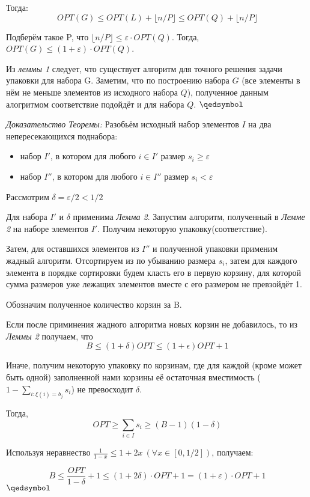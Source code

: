 \documentclass[a4paper,14pt,russian]{article}
\begin{document}
Тогда:
$$ OPT(G) \leq OPT(L) + \lfloor{n/P\rfloor} \leq OPT(Q) + \lfloor{n/P\rfloor}$$

Подберём такое P, что $\lfloor{n/P\rfloor} \leq \varepsilon \cdot OPT(Q)$.
Тогда, $OPT(G) \leq (1 + \varepsilon) \cdot OPT(Q)$. 

Из \textit{леммы 1} следует, что существует алгоритм для точного решения задачи упаковки для набора G. Заметим, что по построению набора $G$ (все элементы в нём не меньше элементов из исходного набора $Q$), полученное данным алогритмом соответствие подойдёт и для набора $Q$.
$\qedsymbol$

\textit{Доказательство Теоремы:} Разобьём исходный набор элементов $I$ на два непересекающихся поднабора:

\begin{itemize}
  \item набор $I'$, в котором для любого $i \in I'$ размер $s_{i} \geq \varepsilon$ 
  \item набор $I''$, в котором для любого $i \in I''$ размер $s_{i} < \varepsilon$ 
\end{itemize}

Рассмотрим $\delta = \varepsilon / 2 < 1/2$

Для набора $I'$ и $\delta$ применима \textit{Лемма 2}. Запустим алгоритм, полученный в \textit{Лемме 2} на наборе элементов $I'$. Получим некоторую упаковку(соответствие). 

Затем, для оставшихся элементов из $I''$ и полученной упаковки применим жадный алгоритм. Отсортируем из по убыванию размера $s_i$, затем для каждого элемента в порядке сортировки будем класть его в первую корзину, для которой сумма размеров уже лежащих элементов вместе с его размером не превзойдёт 1.

Обозначим полученное количество корзин за B.

Если после приминения жадного алгоритма новых корзин не добавилось, то из \textit{Леммы 2} получаем, что  
$$ B \leq (1 + \delta)OPT \leq (1 + \epsilon)OPT + 1$$

Иначе, получим некоторую упаковку по корзинам, где для каждой (кроме может быть одной) заполненной нами корзины её остаточная вместимость ($1 - \sum_{i: \xi(i) = b_j} s_i$) не превосходит $\delta$. 

Тогда, 
$$OPT \geq \sum_{i \in I} s_i \geq (B - 1)(1 - \delta)$$

Используя неравнество $\frac{1}{1 - x} \leq 1 + 2x \: (\forall x \in [0, 1/2])$, получаем:

$$ B \leq \frac{OPT}{1 - \delta} + 1 \leq (1 + 2\delta) \cdot OPT + 1 =  (1 + \varepsilon) \cdot OPT + 1 $$ 
$\qedsymbol$
  
\end{document}
